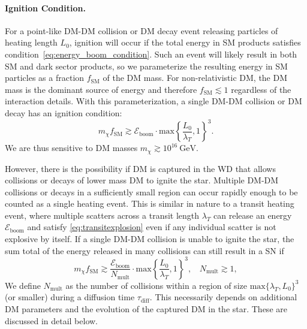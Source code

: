 \documentclass[preprintnumbers,amsmath,amssymb,prd,superscriptaddress]{revtex4}
\newcommand{\Eboom}{\mathcal{E}_\text{boom}}
\newcommand{\GeV}{\text{GeV}}
\begin{document}
\paragraph{Ignition Condition.}
For a point-like DM-DM collision or DM decay event releasing particles of heating length $L_0$, ignition will occur if the total energy in SM products satisfies condition~\eqref{eq:energy_boom_condition}.
Such an event will likely result in both SM and dark sector products, so we parameterize the resulting energy in SM particles as a fraction $f_\text{SM}$ of the DM mass.
For non-relativistic DM, the DM mass is the dominant source of energy and therefore $f_\text{SM} \lesssim 1$ regardless of the interaction details.
With this parameterization, a single DM-DM collision or DM decay has an ignition condition:
\begin{equation}
\label{eq:coldecay}
  m_\chi f_\text{SM}  \gtrsim \Eboom \cdot \text{max} \left \{\frac{L_0}{\lambda_T}, 1 \right \}^3.
\end{equation}
We are thus sensitive to DM masses $m_\chi \gtrsim 10^{16} ~\GeV$.

However, there is the possibility if DM is captured in the WD that allows collisions or decays of lower mass DM to ignite the star. 
Multiple DM-DM collisions or decays in a sufficiently small region can occur rapidly enough to be counted as a single heating event.
This is similar in nature to a transit heating event, where multiple scatters across a transit length $\lambda_T$ can release an energy $\Eboom$ and satisfy \eqref{eq:transitexplosion} even if any individual scatter is not explosive by itself.   
If a single DM-DM collision is unable to ignite the star, the sum total of the energy released in many collisions can still result in a SN if
\begin{equation}
\label{eq:multcolboom}
 m_\chi f_\text{SM} \gtrsim \frac{\Eboom}{N_\text{mult}} \cdot \text{max} \left \{\frac{L_0}{\lambda_T}, 1 \right \}^3, ~~~~ N_\text{mult} \gtrsim 1,
\end{equation}
We define $N_\text{mult}$ as the number of collisions within a region of size $\text{max}\{\lambda_T,L_0\}^3$ (or smaller) during a diffusion time $\tau_\text{diff}$.
This necessarily depends on additional DM parameters and the evolution of the captured DM in the star. 
These are discussed in detail below. 
\end{document}

